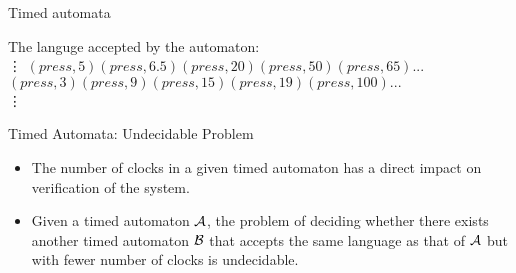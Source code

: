 \documentclass[10pt]{beamer}
\theoremstyle{plain}
\theoremstyle{definition}
\begin{document}
\begin{frame}{Timed automata}
	\begin{figure}[!t]
	\begin{center}
		
	\end{center}
	\end{figure}
	The languge accepted by the automaton: \\
		\vdots
		$(press, 5) (press, 6.5) (press, 20) (press, 50) (press, 65) ...$
		$(press, 3) (press, 9) (press, 15) (press, 19) (press, 100) ...$\\
		\vdots
\end{frame}

\begin{frame}{Timed Automata: Undecidable Problem}
	\begin{itemize}
		\item The number of clocks in a given timed automaton has a direct impact on verification of the system.
		\item Given a timed automaton $\cal A$, the problem of deciding whether there exists another timed automaton $\cal B$ that accepts the same language as that of $\cal A$ but with fewer number of clocks is undecidable.
		
	\end{itemize}
	\vspace{0.5cm}
	
\end{frame}
\end{document}
